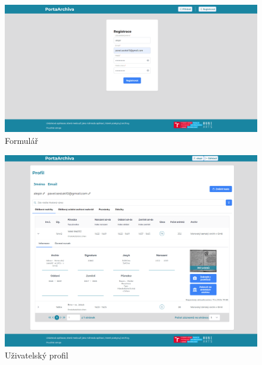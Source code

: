 \begin{figure}[htbp]
\centering
    \includegraphics[scale=.22]{obrazky-figures/implementation/productScreenshots/registration.png}
    \caption{Formulář}
\end{figure}

\begin{figure}[htbp]
\centering
    \includegraphics[scale=.22]{obrazky-figures/implementation/productScreenshots/profile.png}
    \caption{Uživatelský profil}
\end{figure}

